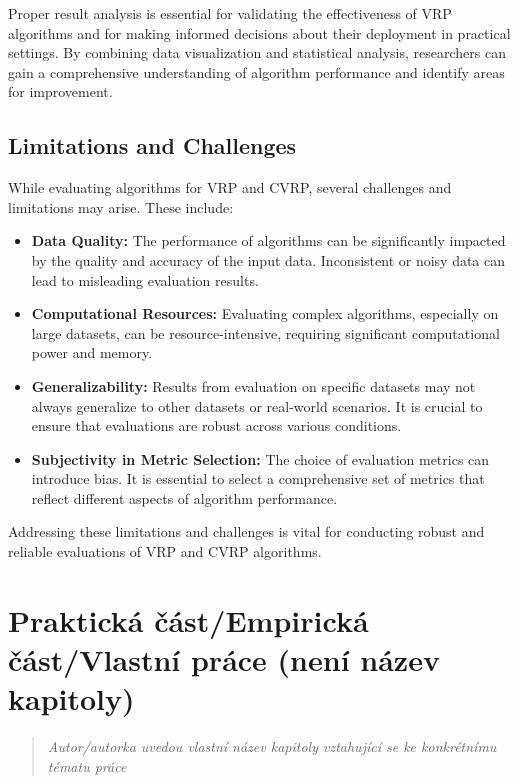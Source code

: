 \documentclass[
]{article}
\begin{document}
Proper result analysis is essential for validating the effectiveness of VRP algorithms and for making informed decisions about their deployment in practical settings. By combining data visualization and statistical analysis, researchers can gain a comprehensive understanding of algorithm performance and identify areas for improvement.


\subsection{Limitations and Challenges}
While evaluating algorithms for VRP and CVRP, several challenges and limitations may arise. These include:
\begin{itemize}
  \item \textbf{Data Quality:} The performance of algorithms can be significantly impacted by the quality and accuracy of the input data. Inconsistent or noisy data can lead to misleading evaluation results.
  \item \textbf{Computational Resources:} Evaluating complex algorithms, especially on large datasets, can be resource-intensive, requiring significant computational power and memory.
  \item \textbf{Generalizability:} Results from evaluation on specific datasets may not always generalize to other datasets or real-world scenarios. It is crucial to ensure that evaluations are robust across various conditions.
  \item \textbf{Subjectivity in Metric Selection:} The choice of evaluation metrics can introduce bias. It is essential to select a comprehensive set of metrics that reflect different aspects of algorithm performance.
\end{itemize}
Addressing these limitations and challenges is vital for conducting robust and reliable evaluations of VRP and CVRP algorithms.



\newpage
\hypertarget{praktickuxe1-ux10duxe1stempirickuxe1-ux10duxe1stvlastnuxed-pruxe1ce-nenuxed-nuxe1zev-kapitoly}{%
  \section{Praktická část/Empirická část/Vlastní práce (není název
    kapitoly)}\label{praktickuxe1-ux10duxe1stempirickuxe1-ux10duxe1stvlastnuxed-pruxe1ce-nenuxed-nuxe1zev-kapitoly}}

\begin{quote}
  \emph{Autor/autorka uvedou vlastní název kapitoly vztahující se ke
    konkrétnímu tématu práce}
\end{quote}
\end{document}
